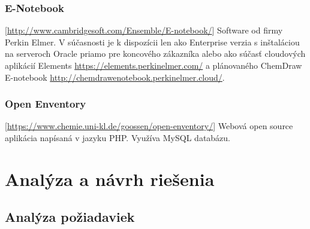 \documentclass[thesis=M,slovak]{FITthesis}[2013/05/06]
\begin{document}
\subsection{E-Notebook} [\url{http://www.cambridgesoft.com/Ensemble/E-notebook/}]
Software od firmy Perkin Elmer. V súčasnosti je k dispozícii len ako Enterprise verzia s inštaláciou na serveroch Oracle priamo pre koncového zákazníka alebo ako súčasť cloudových aplikácií Elements \url{https://elements.perkinelmer.com/} a plánovaného ChemDraw E-notebook \url{http://chemdrawenotebook.perkinelmer.cloud/}.

\subsection{Open Enventory} [\url{https://www.chemie.uni-kl.de/goossen/open-enventory/}]
Webová open source aplikácia napísaná v jazyku PHP. Využíva MySQL databázu.




%
%
%
%

\chapter{Analýza a návrh riešenia}
\section{Analýza požiadaviek}
\end{document}
